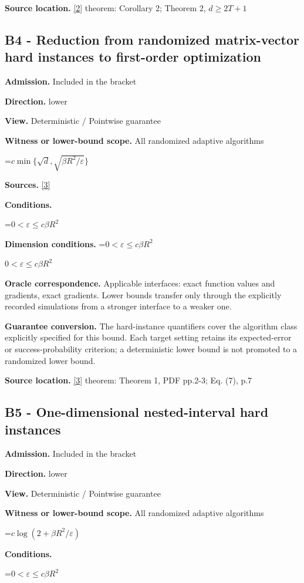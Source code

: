 \documentclass[10pt,a4paper]{article}
\newcommand{\AtlasMath}[1]{\par\begingroup\centering\setbox0=\hbox{$\displaystyle #1$}\ifdim\wd0>1.4\linewidth\typeout{ATLAS WIDE FORMULA: \the\wd0}\fi\ifdim\wd0>\linewidth\resizebox{\linewidth}{!}{\box0}\else\box0\fi\par\endgroup}
\newcommand{\AtlasInlineMath}[1]{\begingroup\setbox0=\hbox{$#1$}\ifdim\wd0>.4\linewidth\endgroup\AtlasMath{#1}\else\endgroup$#1$\fi}
\begin{document}
\textbf{Source location.} \href{https://arxiv.org/pdf/2101.09740v2}{[2]} theorem: Corollary 2; Theorem 2, $d\ge 2T+1$

\subsection{B4 - Reduction from randomized matrix-vector hard instances to first-order optimization}
\textbf{Admission.} Included in the bracket

\textbf{Direction.} lower

\textbf{View.} Deterministic / Pointwise guarantee

\textbf{Witness or lower-bound scope.} All randomized adaptive algorithms

\AtlasMath{c\min\{\sqrt d,\sqrt{\beta R^2/\varepsilon}\}}
\textbf{Sources.} \href{https://arxiv.org/pdf/2609.10874}{[3]}

\textbf{Conditions.} 
\AtlasMath{0<\varepsilon\le c\beta R^2}


\textbf{Dimension conditions.} \AtlasInlineMath{0<\varepsilon\le c\beta R^2}

\textbf{Oracle correspondence.} Applicable interfaces: exact function values and gradients, exact gradients. Lower bounds transfer only through the explicitly recorded simulations from a stronger interface to a weaker one.

\textbf{Guarantee conversion.} The hard-instance quantifiers cover the algorithm class explicitly specified for this bound. Each target setting retains its expected-error or success-probability criterion; a deterministic lower bound is not promoted to a randomized lower bound.

\textbf{Source location.} \href{https://arxiv.org/pdf/2609.10874}{[3]} theorem: Theorem 1, PDF pp.2-3; Eq. (7), p.7

\subsection{B5 - One-dimensional nested-interval hard instances}
\textbf{Admission.} Included in the bracket

\textbf{Direction.} lower

\textbf{View.} Deterministic / Pointwise guarantee

\textbf{Witness or lower-bound scope.} All randomized adaptive algorithms

\AtlasMath{c\log(2+\beta R^2/\varepsilon)}
\textbf{Conditions.} 
\AtlasMath{0<\varepsilon\le c\beta R^2}
\end{document}
